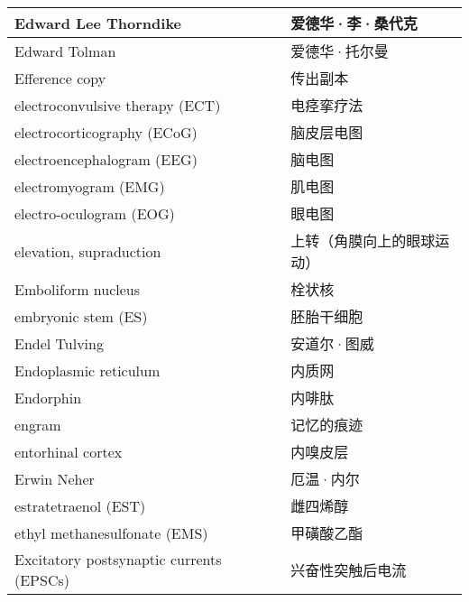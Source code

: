 \begin{longtable}{lll}
	\midrule
	Edward Lee Thorndike     &&  爱德华·李·桑代克  \\
	
	\midrule
	Edward Tolman     &&  爱德华·托尔曼  \\
	
	\midrule
	Efference copy     &&  传出副本  \\
	
	\midrule
	electroconvulsive therapy (ECT)     &&  电痉挛疗法  \\
	
	\midrule
	electrocorticography (ECoG)     &&  脑皮层电图  \\
	
	\midrule
	electroencephalogram (EEG)   &&  脑电图  \\
	
	\midrule
	electromyogram (EMG)     &&  肌电图  \\
	
	\midrule
	electro-oculogram (EOG)     &&  眼电图  \\
	
	\midrule
	elevation, supraduction     &&  上转（角膜向上的眼球运动）  \\
	
	\midrule
	Emboliform nucleus     &&  栓状核  \\
	
	\midrule
	embryonic stem  (ES)   &&  胚胎干细胞  \\
	
	\midrule
	Endel Tulving     &&  安道尔·图威  \\
	
	\midrule
	Endoplasmic reticulum     &&  内质网  \\
	
	\midrule
	Endorphin     &&  内啡肽  \\
	
	\midrule
	engram     &&  记忆的痕迹  \\
	
	\midrule
	entorhinal cortex     &&  内嗅皮层  \\
	
	\midrule
	Erwin Neher    &&  厄温·内尔  \\
	
	\midrule
	estratetraenol (EST)   &&  雌四烯醇  \\
	
	\midrule
	ethyl methanesulfonate (EMS)    &&  甲磺酸乙酯  \\
	
	\midrule
	Excitatory postsynaptic currents (EPSCs)     &&  兴奋性突触后电流  \\
	

\end{longtable}
